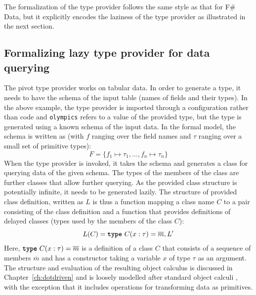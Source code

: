 \documentclass[fleqn,11pt]{report}
\newcommand{\kvd}[1]{\textnormal{\ttfamily\bfseries #1}}
\theoremstyle{definition}
\begin{document}
The formalization of the type provider follows the same style as that for F\# Data, but it explicitly
encodes the laziness of the type provider as illustrated in the next section.

\subsection{Formalizing lazy type provider for data querying}
The pivot type provider works on tabular data. In order to generate a type, it needs to have the
schema of the input table (names of fields and their types). In the above example, the type
provider is imported through a configuration rather than code and \texttt{olympics} refers to a
value of the provided type, but the type is generated using a known schema of the input data.
In the formal model, the schema is written as (with $f$ ranging over the field names and
$\tau$ ranging over a small set of primitive types):
%
\begin{equation*}
F=\{ f_1 \mapsto \tau_1, \ldots, f_n \mapsto \tau_n \}
\end{equation*}
%
When the type provider is invoked, it takes the schema and generates a class for querying data
of the given schema. The types of the members of the class are further classes that allow further
querying. As the provided class structure is potentially infinite, it needs to be generated
lazily. The structure of provided class definition, written as $L$ is thus a function mapping
a class name $C$ to a pair consisting of the class definition and a function that provides
definitions of delayed classes (types used by the members of the class $C$):
%
\begin{equation*}
L(C) = \kvd{type}~C(x:\tau) = \overline{m}, L'
\end{equation*}
%
Here, $\kvd{type}~C(x:\tau) = \overline{m}$ is a definition of a class $C$ that consists of a
sequence of members $\overline{m}$ and has a constructor taking a variable $x$ of type $\tau$ as
an argument. The structure and evaluation of the resulting object calculus is discussed
in Chapter~\ref{ch:dotdriven} and is loosely modelled after standard object calculi
\citep{igarashi-2001-fj,abadi-2012-objects}, with the exception that it includes
operations for transforming data as primitives.
\end{document}
